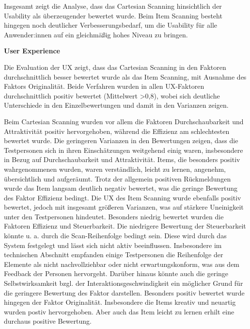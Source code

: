 Insgesamt zeigt die Analyse, dass das Cartesian Scanning hinsichtlich der Usability als überzeugender bewertet wurde. Beim Item Scanning besteht hingegen noch deutlicher Verbesserungsbedarf, um die Usability für alle Anwender:innen auf ein gleichmäßig hohes Niveau zu bringen.

\textbf{User Experience}

Die Evaluation der UX zeigt, dass das Cartesian Scanning in den Faktoren durchschnittlich besser bewertet wurde als das Item Scanning, mit Ausnahme des Faktors Originalität. Beide Verfahren wurden in allen UX-Faktoren durchschnittlich positiv bewertet (Mittelwert >0,8), wobei sich deutliche Unterschiede in den Einzelbewertungen und damit in den Varianzen zeigen.

Beim Cartesian Scanning wurden vor allem die Faktoren Durchschaubarkeit und Attraktivität positiv hervorgehoben, während die Effizienz am schlechtesten bewertet wurde. Die geringeren Varianzen in den Bewertungen zeigen, dass die Testpersonen sich in ihren Einschätzungen weitgehend einig waren, insbesondere in Bezug auf Durchschaubarkeit und Attraktivität. Items, die besonders positiv wahrgenommenen wurden, waren verständlich, leicht zu lernen, angenehm, übersichtlich und aufgeräumt. Trotz der allgemein positiven Rückmeldungen wurde das Item langsam deutlich negativ bewertet, was die geringe Bewertung des Faktor Effizienz bedingt.
Die UX des Item Scanning wurde ebenfalls positiv bewertet, jedoch mit insgesamt größeren Varianzen, was auf stärkere Uneinigkeit unter den Testpersonen hindeutet. Besonders niedrig bewertet wurden die Faktoren Effizienz und Steuerbarkeit. Die niedrigere Bewertung der Steuerbarkeit könnte u. a. durch die Scan-Reihenfolge bedingt sein. Diese wird durch das System festgelegt und lässt sich nicht aktiv beeinflussen. Insbesondere im technischen Abschnitt empfanden einige Testpersonen die Reihenfolge der Elemente als nicht nachvollziehbar oder nicht erwartungskonform, was aus dem Feedback der Personen hervorgeht. Darüber hinaus könnte auch die geringe Selbstwirksamkeit bzgl. der Interaktionsgeschwindigkeit ein möglicher Grund für die geringere Bewertung des Faktor darstellen. 
Besonders positiv bewertet wurde hingegen der Faktor Originalität. Insbesondere die Items kreativ und neuartig wurden postiv hervorgehoben. Aber auch das Item leicht zu lernen erhilt eine durchaus positive Bewertung. 

